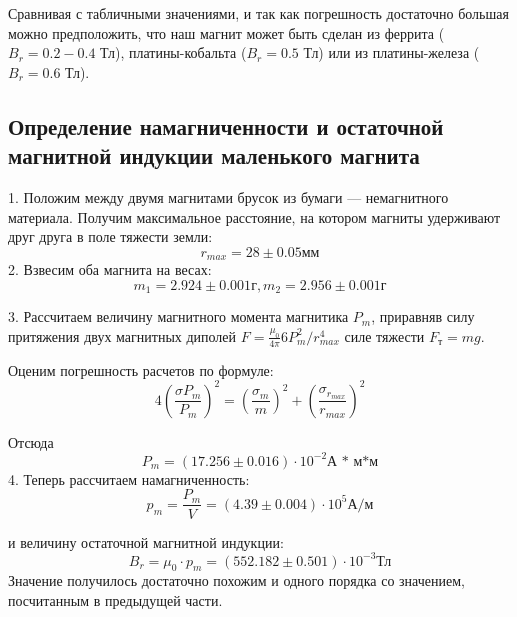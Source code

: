 \documentclass[a4paper]{article}
\begin{document}
	Сравнивая с табличными значениями, и так как погрешность достаточно большая можно предположить, что наш магнит может быть сделан из феррита ($B_{r} = 0.2 - 0.4$ Тл), платины-кобальта ($B_{r} = 0.5$ Тл) или из платины-железа ($B_{r} = 0.6$ Тл).
    
\subsection{Определение намагниченности и остаточной магнитной индукции маленького магнита}

1. Положим между двумя магнитами брусок из бумаги — немагнитного материала. Получим максимальное расстояние, на котором магниты удерживают друг друга в поле тяжести земли:
	\[ r_{max} = 28 \pm 0.05 \text{мм}\]
2. Взвесим оба магнита на весах:
	\[ m_{1} = 2.924 \pm 0.001 \text{г}, m_{2} = 2.956 \pm 0.001 \text{г}\]

3. Рассчитаем величину магнитного момента магнитика $P_{m}$, приравняв силу притяжения двух магнитных диполей $F = \frac{\mu_{0}}{4\pi} 6 P_{m}^{2}/r_{max}^{4}$ силе тяжести $F_{\textbf{т}} = mg$.

	Оценим погрешность расчетов по формуле:
	\[ 4 (\frac{\sigma{P_{m}}}{P_{m}})^{2} =  (\frac{\sigma_{m}}{m})^{2} + (\frac{\sigma_{r_{max}}}{r_{max}})^{2}\]
    
    Отсюда 
   	\[ P_{m} = (17.256 \pm 0.016) \cdot 10^{-2} \text{А * м*м} \]
4. Теперь рассчитаем намагниченность:
	\[ p_{m} = \frac{P_{m}}{V} = (4.39 \pm 0.004) \cdot 10^{5}  \text{А/м} \]
    
    и величину остаточной магнитной индукции:
    \[ B_{r} = \mu_{0} \cdot p_{m} = (552.182 \pm 0.501) \cdot 10^{-3}  \text{Тл}\]
	Значение получилось достаточно похожим и одного порядка со значением, посчитанным в предыдущей части.
\end{document}
